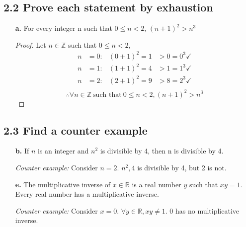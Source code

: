 \documentclass{article}
\newcommand{\bld}{\textbf}
\newcommand{\itl}{\textit}
\begin{document}
\subsection*{2.2 Prove each statement by exhaustion}
\begin{enumerate}
  \item[\bld{a.}] For every integer n such that $0 \leq n < 2$, $(n+1)^2 > n^3$
    \begin{proof}
      Let $n \in \mathbb{Z}$ such that $0 \leq n < 2$,
      \begin{align*}
        n & = 0: & (0+1)^2 = 1 & > 0 = 0^3 \checkmark \\
        n & = 1: & (1+1)^2 = 4 & > 1 = 1^3 \checkmark \\
        n & = 2: & (2+1)^2 = 9 & > 8 = 2^3 \checkmark \\
      \end{align*}
      \[
        \therefore \forall n \in \mathbb{Z}~\text{such that}~0 \leq n < 2, (n+1)^2 > n^3
      \]
    \end{proof}
\end{enumerate}

\subsection*{2.3 Find a counter example}
\begin{enumerate}
  \item[\bld{b.}] If $n$ is an integer and $n^2$ is divisible by 4, then n is divisible by 4.
  \item[] \itl{Counter example:} Consider $n=2$. $n^2,4$ is divisible by 4, but 2 is not.
  \item[\bld{e.}] The multiplicative inverse of $x \in \mathbb{R}$ is a real number $y$ such that
    $xy = 1$. Every real number has a multiplicative inverse.
  \item[] \itl{Counter example:} Consider $x=0$. $\forall y \in \mathbb{R}, xy \not = 1$. 0 has no multiplicative inverse.
\end{enumerate}
\end{document}

